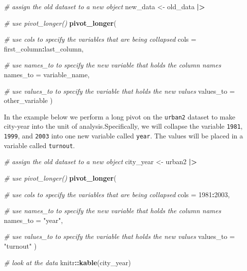 \documentclass[
]{book}
\newenvironment{Shaded}{\begin{snugshade}}{\end{snugshade}}
\newcommand{\AttributeTok}[1]{\textcolor[rgb]{0.13,0.29,0.53}{#1}}
\newcommand{\CommentTok}[1]{\textcolor[rgb]{0.56,0.35,0.01}{\textit{#1}}}
\newcommand{\FunctionTok}[1]{\textcolor[rgb]{0.13,0.29,0.53}{\textbf{#1}}}
\newcommand{\NormalTok}[1]{#1}
\newcommand{\OtherTok}[1]{\textcolor[rgb]{0.56,0.35,0.01}{#1}}
\newcommand{\SpecialCharTok}[1]{\textcolor[rgb]{0.81,0.36,0.00}{\textbf{#1}}}
\newcommand{\StringTok}[1]{\textcolor[rgb]{0.31,0.60,0.02}{#1}}
\begin{document}
\begin{Shaded}
\begin{Highlighting}[]
\CommentTok{\# assign the old dataset to a new object}
\NormalTok{new\_data }\OtherTok{\textless{}{-}}\NormalTok{ old\_data }\SpecialCharTok{|\textgreater{}}
  
  \CommentTok{\# use pivot\_longer()}
  \FunctionTok{pivot\_longer}\NormalTok{(}
    
    \CommentTok{\# use \textasciigrave{}cols\textasciigrave{} to specify the variables that are being collapsed}
    \AttributeTok{cols =}\NormalTok{ first\_column}\SpecialCharTok{:}\NormalTok{last\_column,}
    
    \CommentTok{\# use \textasciigrave{}names\_to\textasciigrave{} to specify the new variable that holds the column names}
    \AttributeTok{names\_to =}\NormalTok{ variable\_name,}
    
    \CommentTok{\# use \textasciigrave{}values\_to\textasciigrave{} to specify the variable that holds the new values}
    \AttributeTok{values\_to =}\NormalTok{ other\_variable}
\NormalTok{  )}
\end{Highlighting}
\end{Shaded}

In the example below we perform a long pivot on the \texttt{urban2} dataset to make city-year into the unit of analysis.Specifically, we will collapse the variable \texttt{1981}, \texttt{1999}, and \texttt{2003} into one new variable called \texttt{year}. The values will be placed in a variable called \texttt{turnout}.

\begin{Shaded}
\begin{Highlighting}[]
\CommentTok{\# assign the old dataset to a new object}
\NormalTok{city\_year }\OtherTok{\textless{}{-}}\NormalTok{ urban2 }\SpecialCharTok{|\textgreater{}}
  
  \CommentTok{\# use pivot\_longer()}
  \FunctionTok{pivot\_longer}\NormalTok{(}
    
    \CommentTok{\# use \textasciigrave{}cols\textasciigrave{} to specify the variables that are being collapsed}
    \AttributeTok{cols =} \StringTok{\textasciigrave{}}\AttributeTok{1981}\StringTok{\textasciigrave{}}\SpecialCharTok{:}\StringTok{\textasciigrave{}}\AttributeTok{2003}\StringTok{\textasciigrave{}}\NormalTok{,}
    
    \CommentTok{\# use \textasciigrave{}names\_to\textasciigrave{} to specify the new variable that holds the column names}
    \AttributeTok{names\_to =} \StringTok{"year"}\NormalTok{,}
    
    \CommentTok{\# use \textasciigrave{}values\_to\textasciigrave{} to specify the variable that holds the new values}
    \AttributeTok{values\_to =} \StringTok{"turnout"}
\NormalTok{  )}

\CommentTok{\# look at the data}
\NormalTok{knitr}\SpecialCharTok{::}\FunctionTok{kable}\NormalTok{(city\_year)}
\end{Highlighting}
\end{Shaded}
\end{document}
